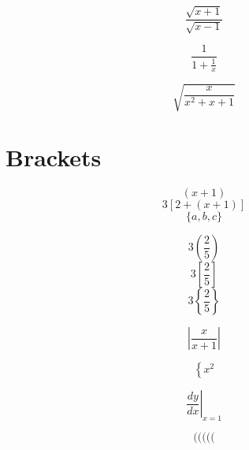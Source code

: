 \documentclass[12pt]{article}
\begin{document}
\[\frac{\sqrt{x+1}}{\sqrt{x-1}}\]

\[\frac{1}{1+\frac{1}{x}}\]

\[\sqrt{\frac{x}{x^2+x+1}}\]

\section{Brackets}
$$(x+1)$$
$$3[2+(x+1)]$$
$$\{a,b,c\}$$

$$3\left(\frac{2}{5}\right)$$
$$3\left[\frac{2}{5}\right]$$
$$3\left\{\frac{2}{5}\right\}$$

$$\left|\frac{x}{x+1}\right|$$

$$\left\{x^2\right.$$

$$\left. \frac{dy}{dx} \right|_{x=1}$$

\[
\Bigg(\bigg(\Big(\big( (
\]
\end{document}
